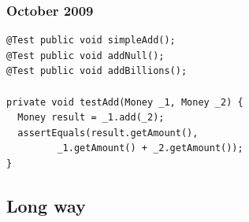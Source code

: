 \documentclass[14pt]{beamer}
\begin{document}
\begin{frame}[fragile]
\frametitle{October 2009}
\begin{center}
\begin{lstlisting}[frame=single]
@Test public void simpleAdd(); 
@Test public void addNull();
@Test public void addBillions();

private void testAdd(Money _1, Money _2) {
  Money result = _1.add(_2);
  assertEquals(result.getAmount(), 
         _1.getAmount() + _2.getAmount());
}
\end{lstlisting} 
\end{center}
\end{frame}

\subsection{Long way}
\end{document}
